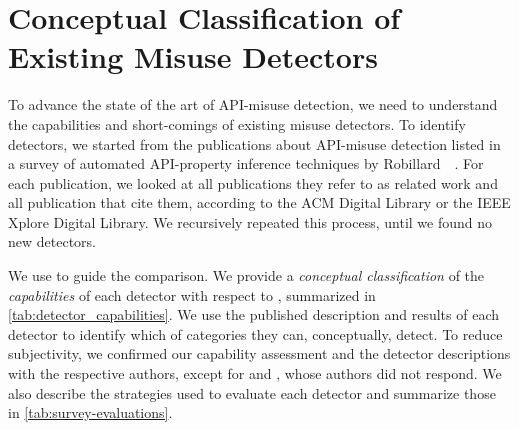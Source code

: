 
\section{Conceptual Classification of Existing Misuse Detectors}
\label{sec:misuse-detectors-related-work}


To advance the state of the art of API-misuse detection, we need to understand the capabilities and short-comings of existing misuse detectors.
To identify detectors, we started from the publications about API-misuse detection listed in a survey of automated API-property inference techniques by Robillard~\etal~\cite{RBMR13}.
For each publication, we looked at all publications they refer to as related work and all publication that cite them, according to the ACM Digital Library or the IEEE Xplore Digital Library.
We recursively repeated this process, until we found no new detectors.

We use \MUC to guide the comparison.
We provide a \textit{conceptual classification} of the \emph{capabilities} of each detector with respect to \MUC, summarized in \autoref{tab:detector_capabilities}.
We use the published description and results of each detector to identify which of \MUC categories they can, conceptually, detect.
To reduce subjectivity, we confirmed our capability assessment and the detector descriptions with the respective authors, except for \PRMiner and \Colibri, whose authors did not respond. 
We also describe the strategies used to evaluate each detector and summarize those in \autoref{tab:survey-evaluations}.



\vspace{0.03in}

